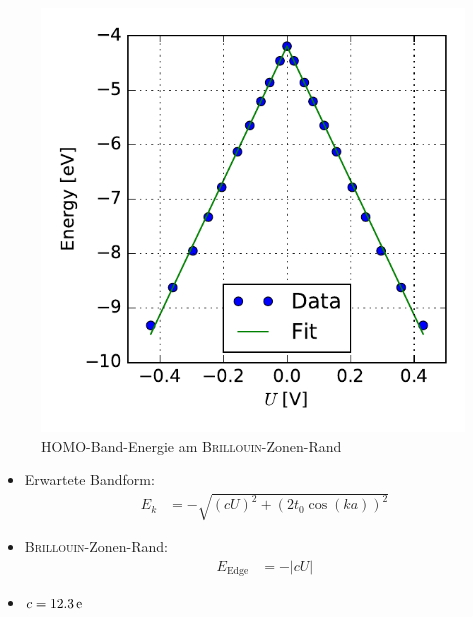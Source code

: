 \begin{frame}
\begin{minipage}{0.49\textwidth}
\begin{figure}
\centering
\includegraphics[width = \textwidth]{Images/Hydrogen/charging/border_energy_q_1}
\caption{HOMO-Band-Energie am \textsc{Brillouin}-Zonen-Rand}
\end{figure}
\end{minipage}
\begin{minipage}{0.49\textwidth}
\begin{itemize}
\setlength{\itemsep}{.5cm}
\item Erwartete Bandform:
\begin{align*}
E_k &= - \sqrt{\left(cU\right)^2 + \left(2t_0\cos(ka)\right)^2}
\end{align*}
\item \textsc{Brillouin}-Zonen-Rand:
\begin{align*}
E_\text{Edge} &= -\left|cU\right|
\end{align*}
\item $c = \unit[12.3]{e}$
\end{itemize}
\end{minipage}
\end{frame}

